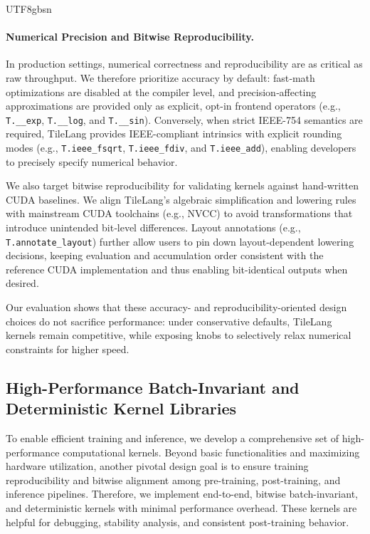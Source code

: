 \documentclass[11pt, a4paper, logo, copyright, nonumbering]{deepseek}
\begin{document}
\begin{CJK*}{UTF8}{gbsn}
\paragraph{Numerical Precision and Bitwise Reproducibility.}
In production settings, numerical correctness and reproducibility are as critical as raw throughput. 
We therefore prioritize accuracy by default: fast‑math optimizations are disabled at the compiler level, and precision‑affecting approximations are provided only as explicit, opt-in frontend operators (e.g., \texttt{T.\_\_exp}, \texttt{T.\_\_log}, and \texttt{T.\_\_sin}). 
Conversely, when strict IEEE-754 semantics are required, TileLang provides IEEE-compliant intrinsics with explicit rounding modes (e.g., \texttt{T.ieee\_fsqrt}, \texttt{T.ieee\_fdiv}, and \texttt{T.ieee\_add}), enabling developers to precisely specify numerical behavior.

We also target bitwise reproducibility for validating kernels against hand‑written CUDA baselines. 
We align TileLang's algebraic simplification and lowering rules with mainstream CUDA toolchains (e.g., NVCC) to avoid transformations that introduce unintended bit‑level differences. 
Layout annotations  (e.g., \texttt{T.annotate\_layout}) further allow users to pin down layout-dependent lowering decisions, keeping evaluation and accumulation order consistent with the reference CUDA implementation and thus enabling bit-identical outputs when desired.

Our evaluation shows that these accuracy- and reproducibility-oriented design choices do not sacrifice performance: under conservative defaults, TileLang kernels remain competitive, while exposing knobs to selectively relax numerical constraints for higher speed.   

\subsection{High-Performance Batch-Invariant and Deterministic Kernel Libraries}
To enable efficient training and inference, we develop a comprehensive set of high-performance computational kernels.
Beyond basic functionalities and maximizing hardware utilization, another pivotal design goal is to ensure training reproducibility and bitwise alignment among pre-training, post-training, and inference pipelines. 
Therefore, we implement end-to-end, bitwise batch-invariant, and deterministic kernels with minimal performance overhead.
These kernels are helpful for debugging, stability analysis, and consistent post-training behavior. 


\end{CJK*}
\end{document}
